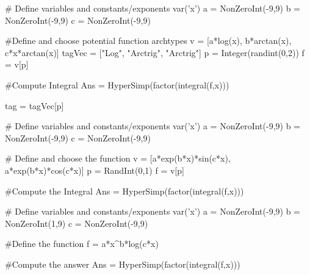 \begin{sagesilent}
# Define variables and constants/exponents
var('x')
a = NonZeroInt(-9,9)
b = NonZeroInt(-9,9)
c = NonZeroInt(-9,9)

#Define and choose potential function archtypes
v = [a*log(x), b*arctan(x), c*x*arctan(x)]
tagVec = ["Log", "Arctrig", "Arctrig"]
p = Integer(randint(0,2))
f = v[p]

#Compute Integral
Ans = HyperSimp(factor(integral(f,x)))

tag = tagVec[p]
\end{sagesilent}


\begin{sagesilent}
# Define variables and constants/exponents
var('x')
a = NonZeroInt(-9,9)
b = NonZeroInt(-9,9)
c = NonZeroInt(-9,9)

# Define and choose the function
v = [a*exp(b*x)*sin(c*x), a*exp(b*x)*cos(c*x)]
p = RandInt(0,1)
f = v[p]

#Compute the Integral
Ans = HyperSimp(factor(integral(f,x)))

\end{sagesilent}



\begin{sagesilent}
# Define variables and constants/exponents
var('x')
a = NonZeroInt(-9,9)
b = NonZeroInt(1,9)
c = NonZeroInt(-9,9)

#Define the function
f = a*x^b*log(c*x)

#Compute the answer
Ans = HyperSimp(factor(integral(f,x)))

\end{sagesilent}


